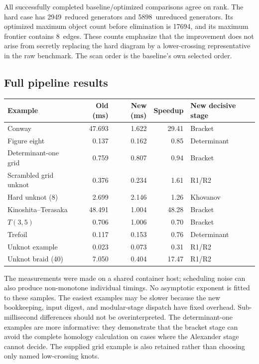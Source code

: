 \documentclass[11pt]{article}
\theoremstyle{remark}\newtheorem{remark}[theorem]{Remark}
\newcommand{\HardRank}{2949}
\newcommand{\HardUnreduced}{5898}
\newcommand{\HardPeakObjects}{17694}
\newcommand{\HardWidth}{8}
\begin{document}
All successfully completed baseline/optimized comparisons agree on rank.
The hard case has \HardRank\ reduced generators and \HardUnreduced\
unreduced generators. Its optimized maximum object count before elimination
is \HardPeakObjects, and its maximum frontier contains \HardWidth\ edges.
These counts emphasize that the improvement does not arise from secretly
replacing the hard diagram by a lower-crossing representative in the raw
benchmark. The scan order is the baseline's own selected order.

\subsection{Full pipeline results}

\begin{center}\small
\begin{tabular}{@{}lrrrl@{}}
\toprule
Example & Old (ms) & New (ms) & Speedup & New decisive stage\\
\midrule
Conway & 47.693 & 1.622 & 29.41 & Bracket\\
Figure eight & 0.137 & 0.162 & 0.85 & Determinant\\
Determinant-one grid & 0.759 & 0.807 & 0.94 & Bracket\\
Scrambled grid unknot & 0.376 & 0.234 & 1.61 & R1/R2\\
Hard unknot (8) & 2.699 & 2.146 & 1.26 & Khovanov\\
Kinoshita--Terasaka & 48.491 & 1.004 & 48.28 & Bracket\\
$T(3,5)$ & 0.706 & 1.006 & 0.70 & Bracket\\
Trefoil & 0.117 & 0.153 & 0.76 & Determinant\\
Unknot example & 0.023 & 0.073 & 0.31 & R1/R2\\
Unknot braid (40) & 7.050 & 0.404 & 17.47 & R1/R2\\
\bottomrule\end{tabular}\end{center}

The measurements were made on a shared container host; scheduling noise can
also produce non-monotone individual timings. No asymptotic exponent is fitted
to these samples. The easiest examples may be slower because the new bookkeeping, input digest,
and modular-stage dispatch have fixed overhead. Sub-millisecond differences
should not be overinterpreted. The determinant-one examples are more
informative: they demonstrate that the bracket stage can avoid the complete
homology calculation on cases where the Alexander stage cannot decide.
The supplied grid example is also retained rather than choosing only named
low-crossing knots.
\end{document}
